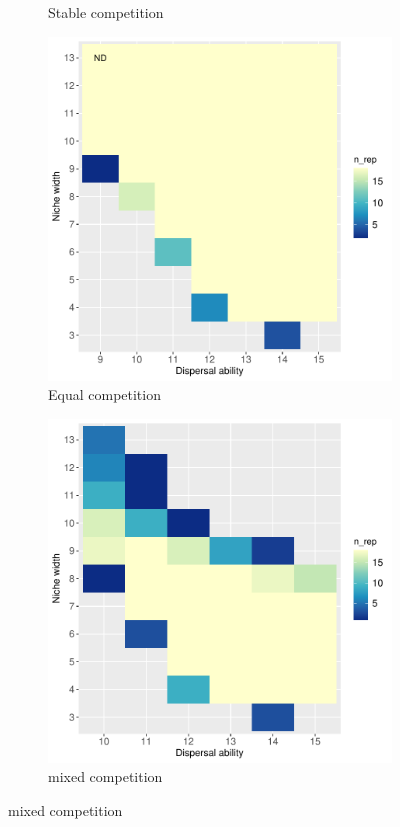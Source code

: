 \begin{figure}
\begin{subfigure}[b]{0.45\linewidth}
			\caption{Stable competition}
			\label{fig:para-stable}
		\end{subfigure}
		\begin{subfigure}[b]{0.45\linewidth}
			\includegraphics[width=\linewidth]{./figures/Parameter_space_overlook_equal_competition.pdf}
			\caption{Equal competition}
			\label{fig:para-equal}
		\end{subfigure}
		\begin{subfigure}[b]{0.45\linewidth}
			\includegraphics[width=\linewidth]{./figures/Parameter_space_overlook_mixed_competition.pdf}
			\caption{mixed competition}
			\label{fig:para-mixed}
		\end{subfigure}
	\end{figure}
